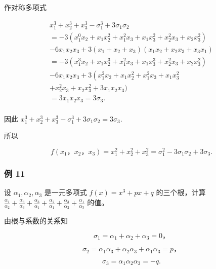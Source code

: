 作对称多项式

\[
\begin{array}{l} x _ {1} ^ {3} + x _ {2} ^ {3} + x _ {3} ^ {3} - \sigma_ {1} ^ {3} + 3 \sigma_ {1} \sigma_ {2} \\ = - 3 \left(x _ {1} ^ {0} x _ {2} + x _ {1} x _ {2} ^ {2} + x _ {1} ^ {2} x _ {3} + x _ {1} x _ {3} ^ {2} + x _ {2} ^ {2} x _ {3} + x _ {2} x _ {3} ^ {2}\right) \\ - 6 x _ {1} x _ {2} x _ {3} + 3 \left(x _ {1} + x _ {2} + x _ {3}\right) \left(x _ {1} x _ {2} + x _ {2} x _ {3} + x _ {3} x _ {1}\right) \\ = - 3 \left(x _ {1} ^ {3} x _ {2} + x _ {1} x _ {2} ^ {3} + x _ {1} ^ {2} x _ {3} + x _ {1} x _ {3} ^ {3} + x _ {2} ^ {2} x _ {3} + x _ {2} x _ {3} ^ {2}\right) \\ - 6 x _ {1} x _ {2} x _ {3} + 3 \left(x _ {1} ^ {2} x _ {2} + x _ {1} x _ {2} ^ {2} + x _ {1} ^ {2} x _ {3} + x _ {1} x _ {3} ^ {2} \right. \\ + x _ {2} ^ {2} x _ {3} + x _ {2} x _ {3} ^ {2} + 3 x _ {1} x _ {2} x _ {3}) \\ = 3 x _ {1} x _ {2} x _ {3} = 3 \sigma_ {3}. \\ \end{array}
\]

因此
\(x_{1}^{3}+x_{2}^{3}+x_{3}^{3}-\sigma_{1}^{3}+3\sigma_{1}\sigma_{2}=3\sigma_{3}.\)

所以

\[
f \left(x _ {1}\text{，} x _ {2}\text{，} x _ {3}\right) = x _ {1} ^ {2} + x _ {2} ^ {2} + x _ {3} ^ {2} = \sigma_ {1} ^ {2} - 3 \sigma_ {1} \sigma_ {2} + 3 \sigma_ {3}.
\]

\subsubsection{例 11}

设 \(\alpha_{1},\alpha_{2},\alpha_{3}\) 是一元多项式
\(f(x) = x^{3} + px + q\) 的三个根，计算
\(\frac{\alpha_1}{\alpha_2} +\frac{\alpha_3}{\alpha_3} +\frac{\alpha_3}{\alpha_1} +\frac{\alpha_2}{\alpha_1} +\frac{\alpha_3}{\alpha_2} +\frac{\alpha_1}{\alpha_3}\)
的值。

 由根与系数的关系知

\[
\sigma_ {1} = \alpha_ {1} + \alpha_ {2} + \alpha_ {3} = 0\text{，}
\]

\[
\sigma_ {2} = \alpha_ {1} \alpha_ {3} + \alpha_ {2} \alpha_ {3} + \alpha_ {1} \alpha_ {3} = p\text{，}
\]

\[
\sigma_ {3} = \alpha_ {1} \alpha_ {2} \alpha_ {3} = - q.
\]

